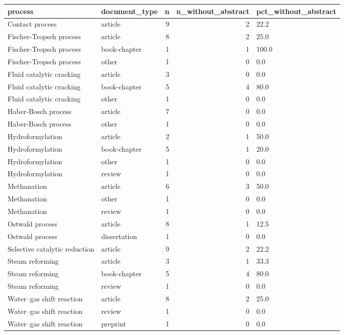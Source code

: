 \begin{tabular}{llrrl}
\toprule
process & document\_type & n & n\_without\_abstract & pct\_without\_abstract \\
\midrule
Contact process & article & 9 & 2 & 22.2 \\
Fischer-Tropsch process & article & 8 & 2 & 25.0 \\
Fischer-Tropsch process & book-chapter & 1 & 1 & 100.0 \\
Fischer-Tropsch process & other & 1 & 0 & 0.0 \\
Fluid catalytic cracking & article & 3 & 0 & 0.0 \\
Fluid catalytic cracking & book-chapter & 5 & 4 & 80.0 \\
Fluid catalytic cracking & other & 1 & 0 & 0.0 \\
Haber-Bosch process & article & 7 & 0 & 0.0 \\
Haber-Bosch process & other & 1 & 0 & 0.0 \\
Hydroformylation & article & 2 & 1 & 50.0 \\
Hydroformylation & book-chapter & 5 & 1 & 20.0 \\
Hydroformylation & other & 1 & 0 & 0.0 \\
Hydroformylation & review & 1 & 0 & 0.0 \\
Methanation & article & 6 & 3 & 50.0 \\
Methanation & other & 1 & 0 & 0.0 \\
Methanation & review & 1 & 0 & 0.0 \\
Ostwald process & article & 8 & 1 & 12.5 \\
Ostwald process & dissertation & 1 & 0 & 0.0 \\
Selective catalytic reduction & article & 9 & 2 & 22.2 \\
Steam reforming & article & 3 & 1 & 33.3 \\
Steam reforming & book-chapter & 5 & 4 & 80.0 \\
Steam reforming & review & 1 & 0 & 0.0 \\
Water–gas shift reaction & article & 8 & 2 & 25.0 \\
Water–gas shift reaction & review & 1 & 0 & 0.0 \\
Water–gas shift reaction & preprint & 1 & 0 & 0.0 \\
\bottomrule
\end{tabular}
